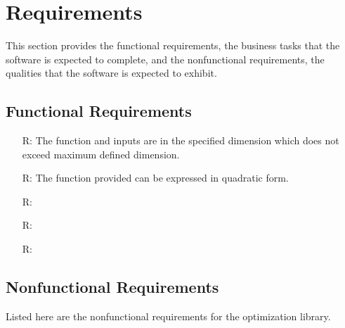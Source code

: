 \documentclass[12pt]{article}
\newcounter{reqnum} %
\begin{document}
\section{Requirements}


This section provides the functional requirements, the business tasks that the
software is expected to complete, and the nonfunctional requirements, the
qualities that the software is expected to exhibit.

\newpage
\subsection{Functional Requirements}

\noindent 
\begin{itemize}

\item[R\refstepcounter{reqnum}\thereqnum \label{r:maxdim}:] The function and inputs are in the specified dimension which does not exceed maximum defined dimension.

\item[R\refstepcounter{reqnum}\thereqnum \label{r:quadratic}:] The function provided can be expressed in quadratic form. 

\item[R\refstepcounter{reqnum}\thereqnum \label{R_Calculate}:] 

\item[R\refstepcounter{reqnum}\thereqnum \label{R_VerifyOutput}:]

\item[R\refstepcounter{reqnum}\thereqnum \label{R_Output}:] 

\end{itemize}

\subsection{Nonfunctional Requirements}

Listed here are the nonfunctional requirements for the optimization library.
\end{document}
